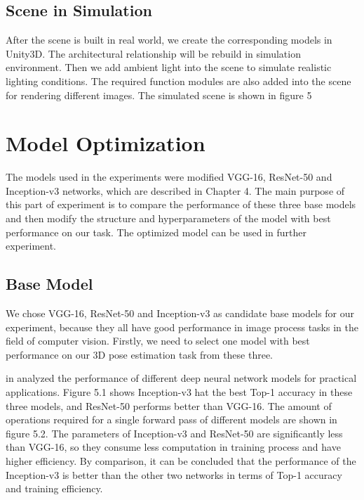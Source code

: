 \missingfigure{}

\subsection{Scene in Simulation}
After the scene is built in real world, we create the corresponding models in Unity3D. The architectural relationship will be rebuild in  simulation environment. Then we add ambient light into the scene to simulate realistic lighting conditions. The required function modules are also added into the scene for rendering different images. The simulated scene is shown in figure 5

\missingfigure{}

\section{Model Optimization}
The models used in the experiments were modified VGG-16, ResNet-50 and Inception-v3 networks, which are described in Chapter 4. The main purpose of this part of experiment is to compare the performance of these three base models and then modify the structure and hyperparameters of the model with best performance on our task. The optimized model can be used in further experiment. 

\subsection{Base Model}
We chose VGG-16, ResNet-50 and Inception-v3 as candidate base models for our experiment, because they all have good performance in image process tasks in the field of computer vision. Firstly, we need to select one model with best performance on our 3D pose estimation task from these three. \author{\textit{\{Canziani, Alfredo and Paszke, Adam and Culurciello, Eugenio}} in \cite{canziani2016analysis} analyzed the performance of different deep neural network models for practical applications. Figure 5.1 shows Inception-v3 hat the best Top-1 accuracy in these three models, and ResNet-50 performs better than VGG-16. The amount of operations required for a single forward pass of different models are shown in figure 5.2. The parameters of Inception-v3 and ResNet-50 are significantly less than VGG-16, so they consume less computation in training process and have higher efficiency. By comparison, it can be concluded that the performance of the Inception-v3 is better than the other two networks in terms of Top-1 accuracy and training efficiency. 

